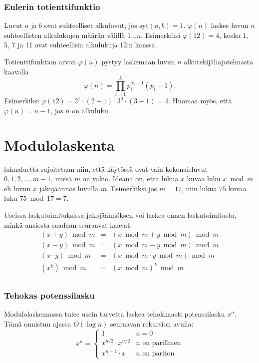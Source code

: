 \subsubsection{Eulerin totienttifunktio}


Luvut $a$ ja $b$ ovat suhteelliset alkuluvut,
jos $\textrm{syt}(a,b)=1$.
 $\varphi(n)$
laskee luvun $n$ suhteellisten alkulukujen
määrän välillä $1 \ldots n$.
Esimerkiksi $\varphi(12)=4$,
koska 1, 5, 7 ja 11 ovat suhteellisia
alkulukuja 12:n kanssa.

Totienttifunktion arvon $\varphi(n)$ pystyy laskemaan
luvun $n$ alkutekijähajotelmasta kaavalla
\[ \varphi(n) = \prod_{i=1}^k p_i^{\alpha_i-1}(p_i-1). \]
Esimerkiksi $\varphi(12)=2^1 \cdot (2-1) \cdot 3^0 \cdot (3-1)=4$.
Huomaa myös, että $\varphi(n)=n-1$,
jos $n$ on alkuluku.

\section{Modulolaskenta}


 lukualuetta rajoitetaan
niin, että käytössä ovat vain
kokonaisluvut $0,1,2,\ldots,m-1$,
missä $m$ on vakio.
Ideana on, että lukua $x$ kuvaa luku $x \bmod m$
eli luvun $x$ jakojäännös luvulla $m$.
Esimerkiksi jos $m=17$, niin lukua $75$ kuvaa luku
$75 \bmod 17 = 7$.

Useissa laskutoimituksissa jakojäännöksen voi laskea
ennen laskutoimitusta, minkä ansiosta saadaan seuraavat kaavat:
\[
\begin{array}{rcl}
(x+y) \bmod m & = & (x \bmod m + y \bmod m) \bmod m \\
(x-y) \bmod m & = & (x \bmod m - y \bmod m) \bmod m \\
(x \cdot y) \bmod m & = & (x \bmod m \cdot y \bmod m) \bmod m \\
(x^k) \bmod m & = & (x \bmod m)^k \bmod m \\
\end{array}
\]

\subsubsection{Tehokas potenssilasku}

Modulolaskennassa tulee usein tarvetta laskea
tehokkaasti potenssilasku $x^n$.
Tämä onnistuu ajassa $O(\log n)$
seuraavan rekursion avulla:
\begin{equation*}
    x^n = \begin{cases}
               1        & n = 0\\
               x^{n/2} \cdot x^{n/2} & \text{$n$ on parillinen}\\
               x^{n-1} \cdot x & \text{$n$ on pariton}
           \end{cases}
\end{equation*}

